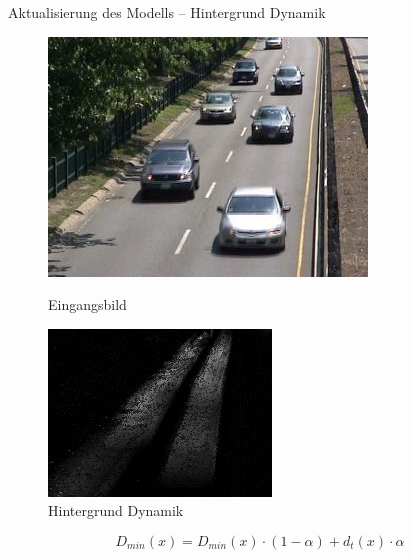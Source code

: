 \documentclass[hyperref={pdfpagelabels=false}]{beamer}
\begin{document}
\begin{frame}[t]{Aktualisierung des Modells -- Hintergrund Dynamik}
	\vspace{1.65em}
	\begin{figure}
		\centering
		\begin{minipage}{0.45\linewidth}
			\includegraphics[width=1\linewidth]{Abbildungen/Eingang3.jpg}
			\caption*{Eingangsbild}
		\end{minipage}
		\begin{minipage}{0.45\linewidth}
			\includegraphics[width=1\linewidth]{Abbildungen/distance.jpg}
			\caption*{Hintergrund Dynamik}
		\end{minipage}
	\end{figure}
	\bigskip
	\begin{equation*}
		D_{min}(x) = D_{min}(x) \cdot (1-\alpha) + d_t(x) \cdot \alpha
	\end{equation*}
\end{frame}
\end{document}
